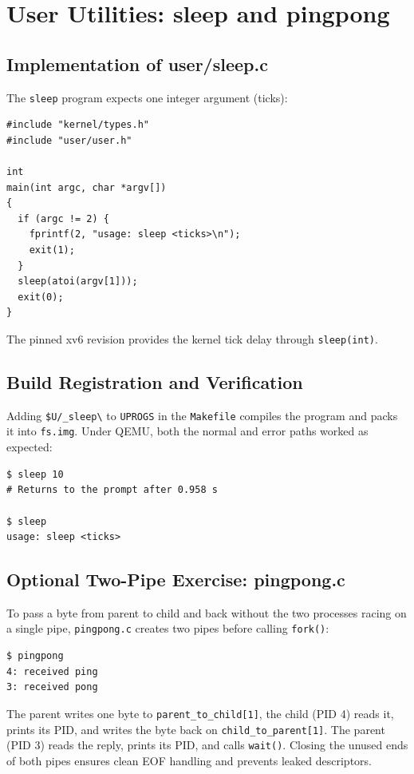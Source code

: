 \documentclass{assets/utmreport}
\begin{document}
\chapter{User Utilities: sleep and pingpong}

\section{Implementation of user/sleep.c}
The \texttt{sleep} program expects one integer argument (ticks):
\begin{verbatim}
#include "kernel/types.h"
#include "user/user.h"

int
main(int argc, char *argv[])
{
  if (argc != 2) {
    fprintf(2, "usage: sleep <ticks>\n");
    exit(1);
  }
  sleep(atoi(argv[1]));
  exit(0);
}
\end{verbatim}

The pinned xv6 revision provides the kernel tick delay through \texttt{sleep(int)}.

\section{Build Registration and Verification}
Adding \texttt{\$U/\_sleep\textbackslash} to \texttt{UPROGS} in the \texttt{Makefile} compiles the program and packs it into \texttt{fs.img}. Under QEMU, both the normal and error paths worked as expected:
\begin{verbatim}
$ sleep 10
# Returns to the prompt after 0.958 s

$ sleep
usage: sleep <ticks>
\end{verbatim}

\section{Optional Two-Pipe Exercise: pingpong.c}
To pass a byte from parent to child and back without the two processes racing on a single pipe, \texttt{pingpong.c} creates two pipes before calling \texttt{fork()}:
\begin{verbatim}
$ pingpong
4: received ping
3: received pong
\end{verbatim}

The parent writes one byte to \texttt{parent\_to\_child[1]}, the child (PID 4) reads it, prints its PID, and writes the byte back on \texttt{child\_to\_parent[1]}. The parent (PID 3) reads the reply, prints its PID, and calls \texttt{wait()}. Closing the unused ends of both pipes ensures clean EOF handling and prevents leaked descriptors.
\end{document}
